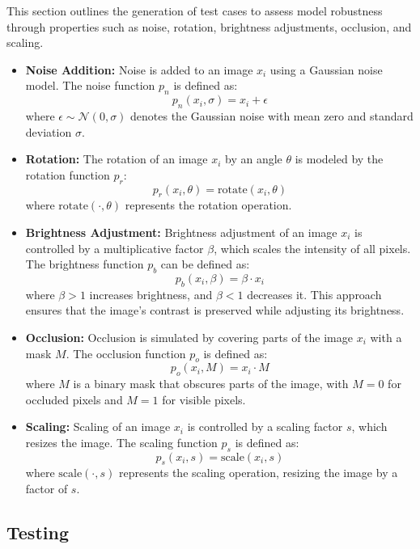 \documentclass[10pt, conference, a4paper, final]{IEEEtran}
\begin{document}
This section outlines the generation of test cases to assess model robustness through properties such as noise, rotation, brightness adjustments, occlusion, and scaling.

\begin{itemize}
    \item \textbf{Noise Addition:} Noise is added to an image \( x_i \) using a Gaussian noise model. The noise function \( p_n \) is defined as:
    \[ p_n(x_i, \sigma) = x_i + \epsilon \]
    where \( \epsilon \sim \mathcal{N}(0, \sigma) \) denotes the Gaussian noise with mean zero and standard deviation \(\sigma\).

    \item \textbf{Rotation:} The rotation of an image \( x_i \) by an angle \(\theta\) is modeled by the rotation function \( p_r \):
    \[ p_r(x_i, \theta) = \text{rotate}(x_i, \theta) \]
    where \(\text{rotate}(\cdot, \theta)\) represents the rotation operation.

    \item \textbf{Brightness Adjustment:} Brightness adjustment of an image \( x_i \) is controlled by a multiplicative factor \( \beta \), which scales the intensity of all pixels. The brightness function \( p_b \) can be defined as:
    \[ p_b(x_i, \beta) = \beta \cdot x_i \]
    where \( \beta > 1 \) increases brightness, and \( \beta < 1 \) decreases it. This approach ensures that the image's contrast is preserved while adjusting its brightness.

    \item \textbf{Occlusion:} Occlusion is simulated by covering parts of the image \( x_i \) with a mask \( M \). The occlusion function \( p_o \) is defined as:
    \[ p_o(x_i, M) = x_i \cdot M \]
    where \( M \) is a binary mask that obscures parts of the image, with \( M = 0 \) for occluded pixels and \( M = 1 \) for visible pixels.

    \item \textbf{Scaling:} Scaling of an image \( x_i \) is controlled by a scaling factor \( s \), which resizes the image. The scaling function \( p_s \) is defined as:
    \[ p_s(x_i, s) = \text{scale}(x_i, s) \]
    where \(\text{scale}(\cdot, s)\) represents the scaling operation, resizing the image by a factor of \( s \).
\end{itemize}


\subsection{Testing }
\end{document}
